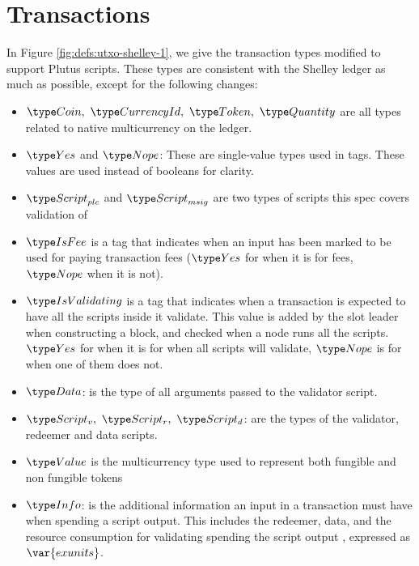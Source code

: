 \section{Transactions}
\label{sec:transactions}

In Figure \ref{fig:defs:utxo-shelley-1}, we give the transaction types modified
to support Plutus scripts. These types are consistent with the Shelley ledger
as much as possible,
except for the following changes:

\begin{itemize}
  \item $\Coin,~\CurrencyId,~\Token,~\Quantity$ are all types
  related to native multicurrency on the ledger.

  \item $\Yes$ and $\Nope$: These are single-value types used in tags. These
  values are used instead of booleans for clarity.

  \item $\ScriptPlutus$ and $\ScriptMSig$ are two types of scripts this spec
  covers validation of

  \item $\IsFee$ is a tag that indicates when an input has been marked
  to be used for paying transaction fees ($\Yes$ for when it is for fees,
  $\Nope$ when it is not).

  \item $\IsValidating$ is a tag that indicates when a transaction is
  expected to have all the scripts inside it validate.
  This value is added by the slot leader when
  constructing a block, and checked when a node runs all the scripts.
  $\Yes$ for when it is for when all scripts will validate,
  $\Nope$ is for when one of them does not.

  \item $\Data$: is the type of all arguments passed to the validator script.

  \item $\ScriptV,~ \ScriptR,~ \ScriptD$: are the types of the validator,
  redeemer and data scripts.

  \item $\Value$ is the multicurrency type used to represent
  both fungible and non fungible tokens

  \item $\Info$: is the additional information an input in a transaction must
  have when spending a script output. This includes the redeemer,
  data, and
  the resource consumption for validating spending the script output
  , expressed as $\var{exunits}$.


\end{itemize}

